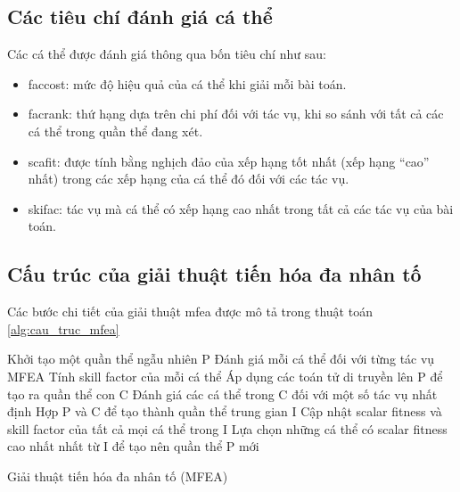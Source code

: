 \subsection{Các tiêu chí đánh giá cá thể} \label{chap_coso:sec_mfea:subsec:tieuchidanhgia}
Các cá thể được đánh giá thông qua bốn tiêu chí như sau:
\begin{itemize}
	\item \gls{faccost}: mức độ hiệu quả của cá thể khi giải mỗi bài toán.
	\item \gls{facrank}: thứ hạng dựa trên chi phí đối với tác vụ, khi so sánh với tất cả các cá thể trong quần thể đang xét.
	\item \gls{scafit}: được tính bằng nghịch đảo của xếp hạng tốt nhất (xếp hạng “cao” nhất) trong các xếp hạng của cá thể đó đối với các tác vụ.
	\item \gls{skifac}: tác vụ mà cá thể có xếp hạng cao nhất trong tất cả các tác vụ của bài toán.
\end{itemize}

\subsection{Cấu trúc của giải thuật tiến hóa đa nhân tố} \label{chap_coso:sec_mfea:subsec:cautrucmfea}
Các bước chi tiết của giải thuật \gls{mfea} được mô tả trong thuật toán \ref{alg:cau_truc_mfea}
\begin{algorithm}[htb]
	\Begin
	{	
		Khởi tạo một quần thể ngẫu nhiên P\;
		Đánh giá mỗi cá thể đối với từng tác vụ MFEA\;
		Tính skill factor của mỗi cá thể\;
		{
			Áp dụng các toán tử di truyền lên P để tạo ra quần thể con C\;
			Đánh giá các cá thể trong C đối với một số tác vụ nhất định\;
			Hợp P và C để tạo thành quần thể trung gian I\;
			Cập nhật scalar fitness và skill factor của tất cả mọi cá thể trong I\;
			Lựa chọn những cá thể có scalar fitness cao nhất nhất từ I để tạo nên quần thể P mới\;
		}
	}
	\caption{Giải thuật tiến hóa đa nhân tố (MFEA)}
	\label{alg:cau_truc_mfea}
\end{algorithm}


